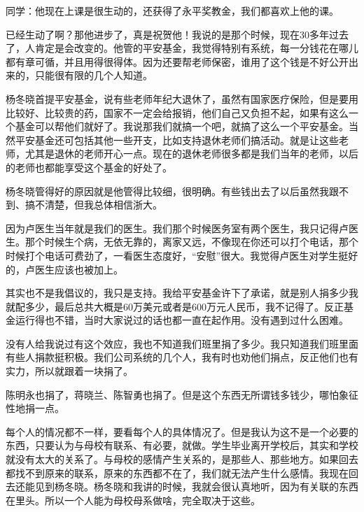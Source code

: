 同学：他现在上课是很生动的，还获得了永平奖教金，我们都喜欢上他的课。

已经生动了啊？那他进步了，真是祝贺他！我说的是那个时候，现在30多年过去了，人肯定是会改变的。他管的平安基金，我觉得特别有系统，每一分钱花在哪儿都有章可循，并且用得很得体。因为还要帮老师保密，谁用了这个钱是不好公开出来的，只能很有限的几个人知道。

杨冬晓首提平安基金，说有些老师年纪大退休了，虽然有国家医疗保险，但是要用比较好、比较贵的药，国家不一定会给报销，他们自己又负担不起，如果有这么一个基金可以帮他们就好了。我说那我们就搞一个吧，就搞了这么一个平安基金。当然平安基金还可包括其他一些开支，比如支持退休老师们搞活动。就是让这些老师，尤其是退休的老师开心一点。现在的退休老师很多都是我们当年的老师，以后的老师也都能享受这个基金的好处了。

杨冬晓管得好的原因就是他管得比较细，很明确。有些钱出去了以后虽然我跟不到、搞不清楚，但我总体相信浙大。


因为卢医生当年就是我们的医生。我们那个时候医务室有两个医生，我只记得卢医生。那个时候生个病，无依无靠的，离家又远，不像现在你还可以打个电话，那个时候打个电话可费劲了，一看医生态度好，“安慰”很大。我觉得卢医生对学生挺好的，卢医生应该也被加上。


其实也不是我倡议的，我只是支持。我给平安基金许下了承诺，就是别人捐多少我就配多少，最后总共大概是60万美元或者是600万元人民币，我不记得了。反正基金运行得也不错，当时大家说过的话也都一直在起作用。没有遇到过什么困难。


没有人给我说过有这个效应，我也不知道我们班里捐了多少。我只知道我们班里面有些人捐款挺积极。我们公司系统的几个人，我有时也劝他们捐点，反正他们也有实力，所以就跟着一块捐了。

陈明永也捐了，蒋晓兰、陈智勇也捐了。但是这个东西无所谓钱多钱少，哪怕象征性地捐一点。


每个人的情况都不一样，要看每个人的具体情况了。但是我认为这不是一个必要的东西，只要认为与母校有联系、有必要，就做。学生毕业离开学校后，其实和学校就没有太大的关系了。与母校的感情产生关系的，是那些人、那些地方。如果回去都找不到原来的联系，原来的东西都不在了，我们就无法产生什么感情。我现在回去还能见到杨冬晓。杨冬晓和我讲的时候，我就会很认真地听，因为有关联的东西在里头。所以一个人能为母校母系做啥，完全取决于这些。

